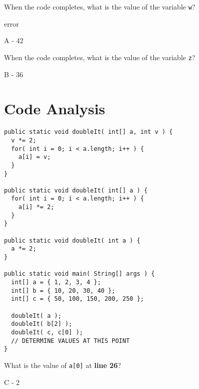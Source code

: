 \documentclass[11pt,answers]{exam}
\begin{document}
\begin{questions}
\question[1] When the code completes, what is the value of the variable {\tt w}? \newline
\begin{oneparchoices}
	    \choice error
\end{oneparchoices}
\begin{solution}
	A - 42 
\end{solution}

\question[1] When the code completes, what is the value of the variable {\tt z}? \newline
\begin{oneparchoices}
	    
\end{oneparchoices}
\begin{solution}
	B - 36 
\end{solution}

\newpage
\section*{Code Analysis}

\begin{lstlisting}
public static void doubleIt( int[] a, int v ) {
  v *= 2;
  for( int i = 0; i < a.length; i++ ) {
    a[i] = v;	
  }	
}	

public static void doubleIt( int[] a ) {
  for( int i = 0; i < a.length; i++ ) {
    a[i] *= 2;	 
  }
}

public static void doubleIt( int a ) {
  a *= 2;	
}

public static void main( String[] args ) {
  int[] a = { 1, 2, 3, 4 };
  int[] b = { 10, 20, 30, 40 };
  int[] c = { 50, 100, 150, 200, 250 };

  doubleIt( a ); 
  doubleIt( b[2] );
  doubleIt( c, c[0] );	
  // DETERMINE VALUES AT THIS POINT
}
\end{lstlisting}

\question[1] What is the value of {\tt a[0]} at {\bf line 26}? \newline
\begin{oneparchoices}
	   
\end{oneparchoices}
\begin{solution} C - 2 \end{solution}


\end{questions}
\end{document}
